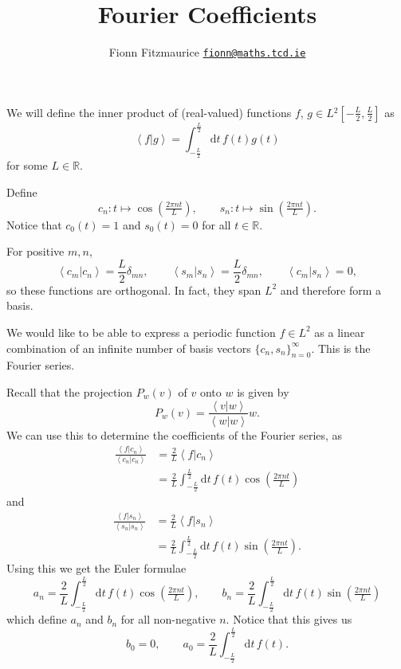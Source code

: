\documentclass[11pt, a4paper]{article}
\title{Fourier Coefficients}
\author{Fionn Fitzmaurice \hspace{20pt} \normalsize{\href{mailto:fionn@maths.tcd.ie}{\texttt{fionn@maths.tcd.ie}}}}
\date{}
\renewcommand{\d}{\ensuremath{\mathrm{d}}}
\newcommand{\braket}[2]{\left\langle #1 \!\left| #2 \right\rangle\right.}
\begin{document}
\maketitle

\noindent We will define the inner product of (real-valued) functions $f$, $g \in L{\!^2} [-\frac{L}{2}, \frac{L}{2}]$ as 
\[
\braket{f}{g} = \int_{-\frac{L}{2}}^\frac{L}{2} \d t \, f(t)g(t)
\]
for some $L \in \mathbb{R}$.

Define
\[
c_n: t \mapsto \cos\left(\tfrac{2\pi n t}{L}\right), \qquad 
s_n :t \mapsto \sin\left(\tfrac{2\pi n t}{L}\right).
\]
Notice that $c_0(t) = 1$ and $s_0(t) = 0$ for all $t \in \mathbb{R}$.

For positive $m, n$,
\[
\braket{c_m}{c_n} %
= \frac{L}{2} \delta_{mn},
\qquad
\braket{s_m}{s_n} = \frac{L}{2}\delta_{mn}, 
\qquad 
\braket{c_m}{s_n} = 0,
\]
so these functions are orthogonal. In fact, they span $L^{\!2}$ and therefore form a basis.

We would like to be able to express a periodic function $f \in L^{\!2}$ as a linear combination of an infinite number of basis vectors $\{c_n, s_n\}_{n=0}^\infty$. This is the Fourier series.

Recall that the projection $P_w(v)$ of $v$ onto $w$ is given by
\[
P_w(v) = \frac{\braket{v}{w}}{\braket{w}{w}} w.
\]
We can use this to determine the coefficients of the Fourier series, as
\begin{align*}
\frac{\braket{f}{c_n}}{\braket{c_n}{c_n}} &= \frac{2}{L} \braket{f}{c_n} \\
    &= \frac{2}{L} \int_{-\frac{L}{2}}^\frac{L}{2} \d t \, f(t) \cos\left(\tfrac{2\pi n t}{L}\right)
\end{align*}
and
\begin{align*}
\frac{\braket{f}{s_n}}{\braket{s_n}{s_n}} &= \frac{2}{L} \braket{f}{s_n} \\
    &= \frac{2}{L} \int_{-\frac{L}{2}}^\frac{L}{2} \d t \, f(t) \sin\left(\tfrac{2\pi n t}{L}\right).
\end{align*}
Using this we get the Euler formulae 
\[
a_n = \frac{2}{L} \int_{-\frac{L}{2}}^\frac{L}{2} \d t \, f(t) \cos\left(\tfrac{2\pi n t}{L}\right), \qquad
b_n = \frac{2}{L} \int_{-\frac{L}{2}}^\frac{L}{2} \d t \, f(t) \sin\left(\tfrac{2\pi n t}{L}\right)
\]
which define $a_n$ and $b_n$ for all non-negative $n$. Notice that this gives us
\[
b_0 = 0, \qquad a_0 = \frac{2}{L} \int_{-\frac{L}{2}}^\frac{L}{2} \d t \, f(t).
\]
\end{document}
